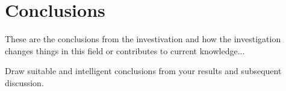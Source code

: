 \chapter{Conclusions}

These are the conclusions from the investivation and how the investigation changes things in this field or contributes to current knowledge...

Draw suitable and intelligent conclusions from your results and subsequent discussion.
